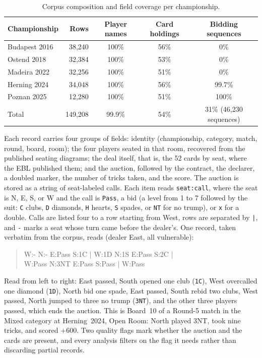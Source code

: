 \documentclass[11pt,a4paper]{article}
\begin{document}
\begin{table}[h]
\centering\small
\caption{Corpus composition and field coverage per championship.}
\label{tab:data}
\begin{tabular}{lrccc}
\toprule
Championship & Rows & Player names & Card holdings & Bidding sequences\\
\midrule
Budapest 2016 & 38{,}240 & 100\% & 56\% & 0\%\\
Ostend 2018   & 32{,}384 & 100\% & 53\% & 0\%\\
Madeira 2022  & 32{,}256 & 100\% & 51\% & 0\%\\
Herning 2024  & 34{,}048 & 100\% & 56\% & 99.7\%\\
Poznan 2025   & 12{,}280 & 100\% & 51\% & 100\%\\
\midrule
Total & 149{,}208 & 99.9\% & 54\% & 31\% (46{,}230 sequences)\\
\bottomrule
\end{tabular}
\end{table}

Each record carries four groups of fields: identity (championship,
category, match, round, board, room); the four players seated in that
room, recovered from the published seating diagrams; the deal itself,
that is, the 52 cards by seat, where the EBL published them; and the
auction, followed by the contract, the declarer, a doubled marker, the
number of tricks taken, and the score. The auction is stored as a
string of seat-labeled calls. Each item reads \texttt{seat:call}, where
the seat is N, E, S, or W and the call is \texttt{Pass}, a bid (a
level from 1 to 7 followed by the suit: \texttt{C} clubs, \texttt{D}
diamonds, \texttt{H} hearts, \texttt{S} spades, or \texttt{NT} for no
trump), or \texttt{x} for a double. Calls are listed four to a row
starting from West, rows are separated by \texttt{|}, and \texttt{-}
marks a seat whose turn came before the dealer's. One record, taken
verbatim from the corpus, reads (dealer East, all vulnerable):

\begin{quote}\small\ttfamily
W:- N:- E:Pass S:1C | W:1D N:1S E:Pass S:2C |\\
W:Pass N:3NT E:Pass S:Pass | W:Pass
\end{quote}

\noindent Read from left to right: East passed, South opened one club
(\texttt{1C}), West overcalled one diamond (\texttt{1D}), North bid
one spade, East passed, South rebid two clubs, West passed, North
jumped to three no trump (\texttt{3NT}), and the other three players
passed, which ends the auction. This is Board~10 of a Round-5 match
in the Mixed category at Herning~2024, Open Room: North played 3NT,
took nine tricks, and scored $+600$. Two quality flags mark whether
the auction and the cards are present, and every analysis filters on
the flag it needs rather than discarding partial records.
\end{document}
